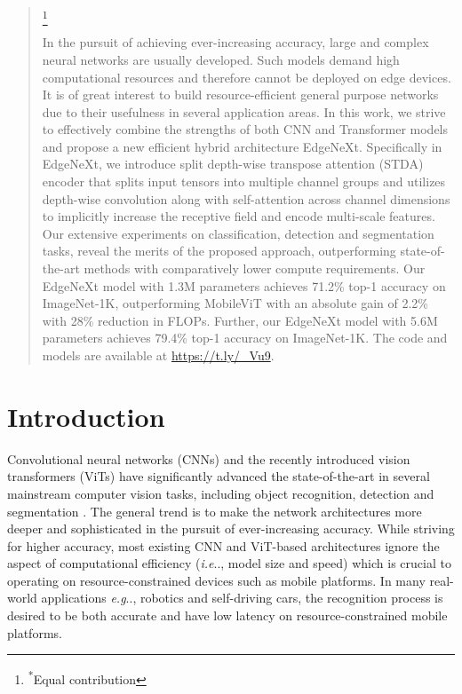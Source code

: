\documentclass[runningheads]{llncs}
\makeatletter
\newcommand\blfootnote[1]{\begingroup
  \renewcommand\thefootnote{}\footnote{#1}\addtocounter{footnote}{-1}\endgroup
}
\DeclareRobustCommand\onedot{\futurelet\@let@token\@onedot}
\def\@onedot{\ifx\@let@token.\else.\null\fi\xspace}
\def\eg{\emph{e.g}\onedot} \def\Eg{\emph{E.g}\onedot}
\def\ie{\emph{i.e}\onedot} \def\Ie{\emph{I.e}\onedot}
\makeatother
\begin{document}
\begin{abstract}
\blfootnote{\textsuperscript{*}Equal contribution}
In the pursuit of achieving ever-increasing accuracy, large and complex neural networks are usually developed. Such models demand high computational resources and therefore cannot be deployed on edge devices. It is of great interest to build resource-efficient general purpose networks due to their usefulness in several application areas. In this work, we strive to effectively combine the strengths of both CNN and Transformer models and propose a new efficient hybrid architecture EdgeNeXt. Specifically in EdgeNeXt, we introduce split depth-wise transpose attention (STDA) encoder that splits input tensors into multiple channel groups and utilizes depth-wise convolution along with self-attention across channel dimensions to implicitly increase the receptive field and encode multi-scale features. Our extensive experiments on classification, detection and segmentation tasks, reveal the merits of the proposed approach, outperforming state-of-the-art methods with comparatively lower compute requirements. Our EdgeNeXt model with 1.3M parameters achieves 71.2\% top-1 accuracy on ImageNet-1K, outperforming MobileViT with an absolute gain of 2.2\% with 28\% reduction in FLOPs. Further, our EdgeNeXt model with 5.6M parameters achieves 79.4\% top-1 accuracy on ImageNet-1K. The code and models are available at \url{https://t.ly/_Vu9}.
\end{abstract}

\section{Introduction}
Convolutional neural networks (CNNs) and the recently introduced vision transformers (ViTs) have significantly advanced the state-of-the-art in several mainstream computer vision tasks, including object recognition, detection and segmentation \cite{schmidhuber2015deep,khan2021transformers}. The general trend is to make the network architectures more deeper and sophisticated in the pursuit of ever-increasing accuracy. While striving for higher accuracy, most existing CNN and ViT-based architectures ignore the aspect of computational efficiency (\ie, model size and speed) which is crucial to operating on resource-constrained devices such as mobile platforms. In many real-world applications \eg, robotics and self-driving cars, the recognition process is desired to be both accurate and have low latency on resource-constrained mobile platforms.
\end{document}
